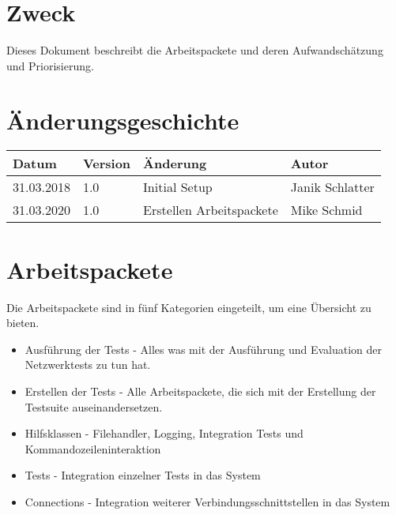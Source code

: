 \documentclass[
	ngerman,
	toc=listof, %
	toc=bibliography, %
	footnotes=multiple, %
	parskip=half, %
	numbers=noendperiod %
]{scrartcl}
\newcommand{\vorlagenOrdner}{../../99_Vorlagen} %
\begin{document}
\thispagestyle{plain}

\cleardoublepage


\section*{Zweck}
Dieses Dokument beschreibt die Arbeitspackete und deren Aufwandschätzung und Priorisierung.

\section*{Änderungsgeschichte}
\begin{tabularx}{\textwidth}{llXl}
	\toprule
	Datum & Version & Änderung & Autor \\
	\midrule
	31.03.2018 & 1.0 & Initial Setup & Janik Schlatter \\
	31.03.2020 & 1.0 & Erstellen Arbeitspackete & Mike Schmid \\
	\bottomrule
\end{tabularx}
\cleardoublepage

{}
\tableofcontents
\cleardoublepage

\let\stdsection\section
\renewcommand\section{\clearpage\stdsection}

\section{Arbeitspackete}
Die Arbeitspackete sind in fünf Kategorien eingeteilt, um eine Übersicht zu bieten. 
\begin{itemize}
	\item Ausführung der Tests - Alles was mit der Ausführung und Evaluation der Netzwerktests zu tun hat.
	\item Erstellen der Tests - Alle Arbeitspackete, die sich mit der Erstellung der Testsuite auseinandersetzen.
	\item Hilfsklassen - Filehandler, Logging, Integration Tests und Kommandozeileninteraktion
	\item Tests - Integration einzelner Tests in das System
	\item Connections - Integration weiterer Verbindungsschnittstellen in das System
\end{itemize}
\end{document}
